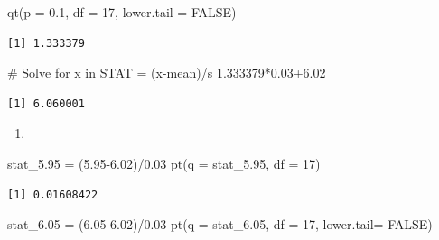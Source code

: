 \documentclass[
  letterpaper,
  DIV=11,
  numbers=noendperiod]{scrreprt}
\newenvironment{Shaded}{\begin{snugshade}}{\end{snugshade}}
\newcommand{\AttributeTok}[1]{\textcolor[rgb]{0.40,0.45,0.13}{#1}}
\newcommand{\CommentTok}[1]{\textcolor[rgb]{0.37,0.37,0.37}{#1}}
\newcommand{\ConstantTok}[1]{\textcolor[rgb]{0.56,0.35,0.01}{#1}}
\newcommand{\DecValTok}[1]{\textcolor[rgb]{0.68,0.00,0.00}{#1}}
\newcommand{\FloatTok}[1]{\textcolor[rgb]{0.68,0.00,0.00}{#1}}
\newcommand{\FunctionTok}[1]{\textcolor[rgb]{0.28,0.35,0.67}{#1}}
\newcommand{\NormalTok}[1]{\textcolor[rgb]{0.00,0.23,0.31}{#1}}
\newcommand{\OtherTok}[1]{\textcolor[rgb]{0.00,0.23,0.31}{#1}}
\newcommand{\SpecialCharTok}[1]{\textcolor[rgb]{0.37,0.37,0.37}{#1}}
\providecommand{\tightlist}{%
  \setlength{\itemsep}{0pt}\setlength{\parskip}{0pt}}\usepackage{longtable,booktabs,array}
\theoremstyle{definition}
\theoremstyle{remark}
\begin{document}
\begin{Shaded}
\begin{Highlighting}[]
\FunctionTok{qt}\NormalTok{(}\AttributeTok{p =} \FloatTok{0.1}\NormalTok{, }\AttributeTok{df =} \DecValTok{17}\NormalTok{, }\AttributeTok{lower.tail =} \ConstantTok{FALSE}\NormalTok{)}
\end{Highlighting}
\end{Shaded}

\begin{verbatim}
[1] 1.333379
\end{verbatim}

\begin{Shaded}
\begin{Highlighting}[]
\CommentTok{\# Solve for x in STAT = (x{-}mean)/s}
\FloatTok{1.333379}\SpecialCharTok{*}\FloatTok{0.03+6.02}
\end{Highlighting}
\end{Shaded}

\begin{verbatim}
[1] 6.060001
\end{verbatim}

\begin{enumerate}
\def\labelenumi{\alph{enumi})}
\setcounter{enumi}{2}
\tightlist
\item
\end{enumerate}

\begin{Shaded}
\begin{Highlighting}[]
\NormalTok{stat\_5}\FloatTok{.95} \OtherTok{=}\NormalTok{ (}\FloatTok{5.95{-}6.02}\NormalTok{)}\SpecialCharTok{/}\FloatTok{0.03}
\FunctionTok{pt}\NormalTok{(}\AttributeTok{q =}\NormalTok{ stat\_5}\FloatTok{.95}\NormalTok{, }\AttributeTok{df =} \DecValTok{17}\NormalTok{)}
\end{Highlighting}
\end{Shaded}

\begin{verbatim}
[1] 0.01608422
\end{verbatim}

\begin{Shaded}
\begin{Highlighting}[]
\NormalTok{stat\_6}\FloatTok{.05} \OtherTok{=}\NormalTok{ (}\FloatTok{6.05{-}6.02}\NormalTok{)}\SpecialCharTok{/}\FloatTok{0.03}
\FunctionTok{pt}\NormalTok{(}\AttributeTok{q =}\NormalTok{ stat\_6}\FloatTok{.05}\NormalTok{, }\AttributeTok{df =} \DecValTok{17}\NormalTok{, }\AttributeTok{lower.tail=} \ConstantTok{FALSE}\NormalTok{)}
\end{Highlighting}
\end{Shaded}
\end{document}
